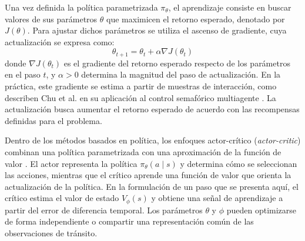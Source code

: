 Una vez definida la política parametrizada $\pi_\theta$, el aprendizaje consiste en buscar valores de sus parámetros $\theta$ que maximicen el retorno esperado, denotado por $J(\theta)$. Para ajustar dichos parámetros se utiliza el ascenso de gradiente, cuya actualización se expresa como:
\begin{equation}
    \theta_{t+1} = \theta_t + \alpha \nabla J(\theta_t)
    \label{eq:ascenso_gradiente}
\end{equation}
donde $\nabla J(\theta_t)$ es el gradiente del retorno esperado respecto de los parámetros en el paso $t$, y $\alpha>0$ determina la magnitud del paso de actualización. En la práctica, este gradiente se estima a partir de muestras de interacción, como describen Chu et al. en su aplicación al control semafórico multiagente \cite{Chu2019}. La actualización busca aumentar el retorno esperado de acuerdo con las recompensas definidas para el problema.

Dentro de los métodos basados en política, los enfoques actor-crítico (\textit{actor-critic}) combinan una política parametrizada con una aproximación de la función de valor \cite{konda2003actorcritic}. El actor representa la política $\pi_\theta(a\mid s)$ y determina cómo se seleccionan las acciones, mientras que el crítico aprende una función de valor que orienta la actualización de la política. En la formulación de un paso que se presenta aquí, el crítico estima el valor de estado $V_\phi(s)$ y obtiene una señal de aprendizaje a partir del error de diferencia temporal. Los parámetros $\theta$ y $\phi$ pueden optimizarse de forma independiente o compartir una representación común de las observaciones de tránsito.

